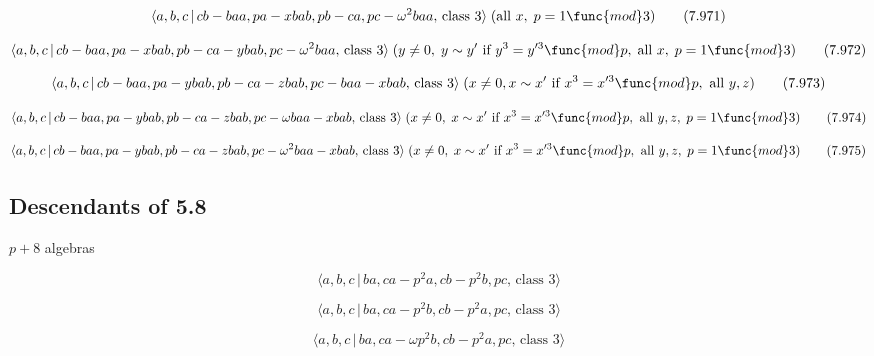 \documentclass[10pt]{article}
\begin{document}
\begin{equation}
\langle a,b,c\,|\,cb-baa,pa-xbab,pb-ca,pc-\omega ^{2}baa,\,\text{class }%
3\rangle \;(\text{all }x,\;p=1\func{mod}3)  \tag{7.971}
\end{equation}

\begin{equation}
\langle a,b,c\,|\,cb-baa,pa-xbab,pb-ca-ybab,pc-\omega ^{2}baa,\,\text{class }%
3\rangle \;(y\neq 0,\;y\sim y^{\prime }\text{ if }y^{3}=y^{\prime 3}\func{mod%
}p,\;\text{all }x,\;p=1\func{mod}3)  \tag{7.972}
\end{equation}

\begin{equation}
\langle a,b,c\,|\,cb-baa,pa-ybab,pb-ca-zbab,pc-baa-xbab,\,\text{class }%
3\rangle \;(x\neq 0,x \sim x^{\prime }\text{ if }x^3=x^{\prime 3}\func{mod}p,%
\text{ all }y,z)  \tag{7.973}
\end{equation}

\begin{equation}
\langle a,b,c\,|\,cb-baa,pa-ybab,pb-ca-zbab,pc-\omega baa-xbab,\,\text{class 
}3\rangle \;(x\neq 0,\;x\sim x^{\prime }\text{ if }x^{3}=x^{\prime 3}\func{%
mod}p,\text{ all }y,z,\;p=1\func{mod}3)  \tag{7.974}
\end{equation}

\begin{equation}
\langle a,b,c\,|\,cb-baa,pa-ybab,pb-ca-zbab,pc-\omega ^{2}baa-xbab,\,\text{%
class }3\rangle \;(x\neq 0,\;x\sim x^{\prime }\text{ if }x^{3}=x^{\prime 3}%
\func{mod}p,\text{ all }y,z,\;p=1\func{mod}3)  \tag{7.975}
\end{equation}

\subsection{Descendants of 5.8}

$p+8$ algebras

\begin{equation}
\langle a,b,c\,|\,ba,ca-p^2a,cb-p^2b,pc,\,\text{class }3\rangle  \tag{7.976}
\end{equation}

\begin{equation}
\langle a,b,c\,|\,ba,ca-p^2b,cb-p^2a,pc,\,\text{class }3\rangle  \tag{7.977}
\end{equation}

\begin{equation}
\langle a,b,c\,|\,ba,ca-\omega p^{2}b,cb-p^{2}a,pc,\,\text{class }3\rangle 
\tag{7.978}
\end{equation}
\end{document}
